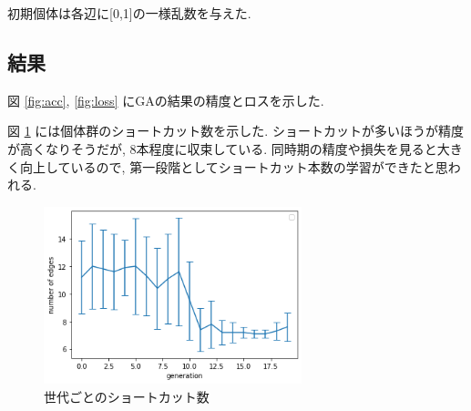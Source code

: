 \documentclass[twocolumn]{jarticle}     %
\begin{document}
初期個体は各辺に[0,1]の一様乱数を与えた.

\subsection{結果}

図 \ref{fig:acc}, \ref{fig:loss} にGAの結果の精度とロスを示した.

図 \ref{fig:edge} には個体群のショートカット数を示した.
ショートカットが多いほうが精度が高くなりそうだが, 8本程度に収束している.
同時期の精度や損失を見ると大きく向上しているので, 第一段階としてショートカット本数の学習ができたと思われる.

\begin{figure}[tb]
  \begin{center}
    \includegraphics[clip,width=75mm]{edge.png}
    \caption{世代ごとのショートカット数}
    \label{fig:edge}
  \end{center}
\end{figure}
\end{document}
